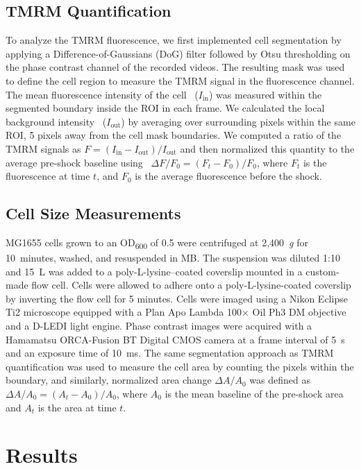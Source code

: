 \documentclass[twocolumn]{biophys-new}%
\begin{document}
\subsection*{\textbf{TMRM Quantification}}
To analyze the TMRM fluorescence, we first implemented cell segmentation by applying a Difference-of-Gaussians (DoG) filter followed by Otsu thresholding on the phase contrast channel of the recorded videos. The resulting mask was used to define the cell region to measure the TMRM signal in the fluorescence channel. The mean fluorescence intensity of the cell ~($I_{\mathrm{in}}$) was measured within the segmented boundary inside the ROI in each frame. We calculated the local background intensity ~($I_{\mathrm{out}}$) by averaging over surrounding pixels within the same ROI, 5 pixels away from the cell mask boundaries. We computed a ratio of the TMRM signals as $F=(I_{\mathrm{in}} - I_{\mathrm{out}})/I_{\mathrm{out}}$ and then normalized this quantity to the average pre-shock baseline using ~$\Delta F/F_{0} = (F_{t} - F_{0})/F_{0}$, where $F_t$ is the fluorescence at time $t$, and $F_0$ is the average fluorescence before the shock.

\subsection*{\textbf{Cell Size Measurements}}
MG1655 cells grown to an OD\textsubscript{600} of 0.5 were centrifuged at 2,400~\textit{g} for 10~minutes, washed, and resuspended in MB. The suspension was diluted 1:10 and 15~\textmu L was added to a poly-L-lysine–coated coverslip mounted in a custom-made flow cell. Cells were allowed to adhere onto a poly-L-lysine-coated coverslip by inverting the flow cell for 5 minutes. Cells were imaged using a Nikon Eclipse Ti2 microscope equipped with a Plan Apo Lambda 100$\times$ Oil Ph3 DM objective and a D-LEDI light engine. Phase contrast images were acquired with a Hamamatsu ORCA-Fusion BT Digital CMOS camera at a frame interval of 5~s and an exposure time of 10~ms. The same segmentation approach as TMRM quantification was used to measure the cell area by counting the pixels within the boundary, and similarly, normalized area change $\Delta A/A_{0}$ was defined as ~$\Delta A/A_{0} = (A_{t} - A_{0})/A_{0}$, where $A_{0}$ is the mean baseline of the pre-shock area and $A_{t}$ is the area at time $t$.


\section*{Results}
\end{document}
